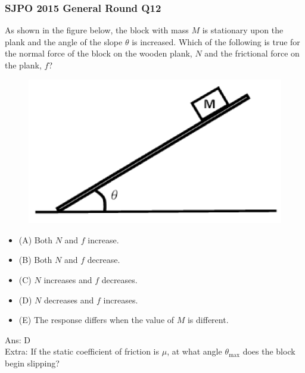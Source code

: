 \documentclass{article}
\begin{document}
\subsubsection{SJPO 2015 General Round Q12}
As shown in the figure below, the block with mass $M$ is stationary upon the plank and the angle of the slope $\theta$ is increased. Which of the following is true for the normal force of the block on the wooden plank, $N$ and the frictional force on the plank, $f$? \\
\begin{figure}
\includegraphics[width=1.0\linewidth]{images/sjpo2015q12.png}
\end{figure}


\begin{itemize}
\item[] (A) Both $N$ and $f$ increase.
\item[] (B) Both $N$ and $f$ decrease.
\item[] (C) $N$ increases and $f$ decreases.
\item[] (D) $N$ decreases and $f$ increases.
\item[] (E) The response differs when the value of $M$ is different.
\end{itemize}
Ans: \ifpaper D \fi \\[10pt]
Extra: If the static coefficient of friction is $\mu$, at what angle $\theta_{\text{max}}$ does the block begin slipping?
\end{document}

